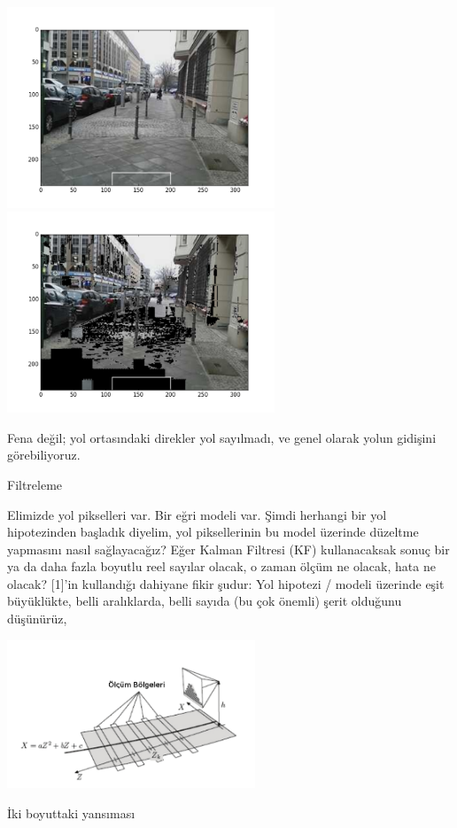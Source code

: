 \documentclass[12pt,fleqn]{article}\usepackage{../../common}
\begin{document}
\includegraphics[height=6cm]{vision_70road_07.png}
\includegraphics[height=6cm]{vision_70road_06.png}

Fena değil; yol ortasındaki direkler yol sayılmadı, ve genel olarak yolun
gidişini görebiliyoruz. 

Filtreleme

Elimizde yol pikselleri var. Bir eğri modeli var. Şimdi herhangi bir yol
hipotezinden başladık diyelim, yol piksellerinin bu model üzerinde
düzeltme yapmasını nasıl sağlayacağız? Eğer Kalman Filtresi (KF)
kullanacaksak sonuç bir ya da daha fazla boyutlu reel sayılar olacak, o
zaman ölçüm ne olacak, hata ne olacak? [1]'in kullandığı dahiyane fikir
şudur: Yol hipotezi / modeli üzerinde eşit büyüklükte, belli aralıklarda,
belli sayıda (bu çok önemli) şerit olduğunu düşünürüz,

\includegraphics[width=20em]{vision_70road_04.png}

İki boyuttaki yansıması
\end{document}
